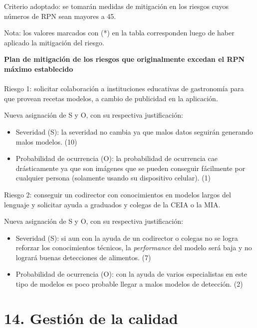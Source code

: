 \documentclass[
11pt, %
]{charter}
\begin{document}
Criterio adoptado: se tomarán medidas de mitigación en los riesgos cuyos números de RPN
sean mayores a 45.

Nota: los valores marcados con (*) en la tabla corresponden luego de haber aplicado la
mitigación del riesgo.


\textbf{Plan de mitigación de los riesgos que originalmente excedan el RPN máximo establecido}\\\\
Riesgo 1: solicitar colaboración a instituciones educativas de gastronomía para que provean recetas modelos, a cambio de publicidad en la aplicación.

Nueva asignación de S y O, con su respectiva justificación:
\begin{itemize}
\item Severidad (S): la severidad no cambia ya que malos datos seguirán generando malos modelos. (10)
\item Probabilidad de ocurrencia (O): la probabilidad de ocurrencia cae drásticamente ya que son imágenes que se pueden conseguir fácilmente por cualquier persona (solamente usando su dispositivo celular). (1)
\end{itemize}

Riesgo 2: conseguir un codirector con conocimientos en modelos largos del lenguaje y solicitar ayuda a graduados y colegas de la CEIA o la MIA.

Nueva asignación de S y O, con su respectiva justificación:
\begin{itemize}
\item Severidad (S):  si aun con la ayuda de un codirector o colegas no se logra reforzar los conocimientos técnicos, la \textit{performance} del modelo será baja y no logrará buenas detecciones de alimentos. (7)
\item Probabilidad de ocurrencia (O): con la ayuda de varios especialistas en este tipo de modelos es poco probable llegar a malos modelos de detección. (2)
\end{itemize}


\section{14. Gestión de la calidad}
\label{sec:calidad}
\end{document}
